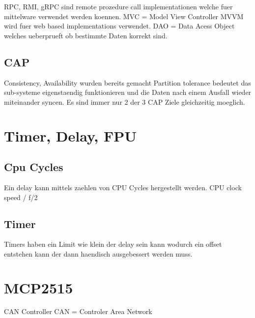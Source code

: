 RPC, RMI, gRPC sind remote prozedure call implementationen welche fuer mittelware verwendet werden koennen.
MVC = Model View Controller
MVVM wird fuer web based implementations verwendet. 
DAO = Data Acess Object welches ueberprueft ob bestimmte Daten korrekt sind.

\subsection{CAP}
Consistency, Availability wurden bereits gemacht
Partition tolerance bedeutet das sub-systeme eigenstaendig funktionieren und die Daten nach einem Ausfall wieder miteinander syncen.
Es sind immer nur 2 der 3 CAP Ziele gleichzeitig moeglich.

\section{Timer, Delay, FPU}
\subsection{Cpu Cycles}
Ein delay kann mittels zaehlen von CPU Cycles hergestellt werden.
CPU clock speed / f/2
\subsection{Timer}
Timers haben ein Limit wie klein der delay sein kann wodurch ein offset entstehen kann der dann haendisch ausgebessert werden muss.
\section{MCP2515}
CAN Controller
CAN = Controler Area Network